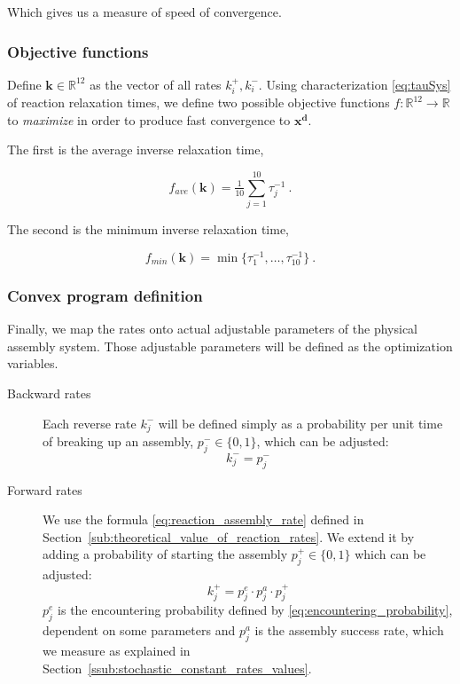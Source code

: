 		Which gives us a measure of speed of convergence.

		
		\subsubsection{Objective functions} %
		\label{ssub:objective_functions}
		
		Define $\mathbf{k} \in \mathbb{R}^{12}$ as the vector of all rates
		$k_i^+, k_i^-$. Using characterization \eqref{eq:tauSys} of reaction
		relaxation times, we define two possible objective functions
		$f:\mathbb{R}^{12} \rightarrow \mathbb{R}$ to {\it maximize} in
		order to produce fast convergence to $\mathbf{x^d}$.
		
		The first is the average inverse relaxation time,

		\begin{equation}
			f_{ave}(\mathbf{k}) = \tfrac{1}{10} \sum_{j=1}^{10} \tau_j^{-1}~.
		\end{equation}

		The second is the minimum inverse relaxation time,

		\begin{equation}
			f_{min}(\mathbf{k}) = \min \{ \tau_1^{-1}, \ldots, \tau_{10}^{-1}\}~.
		\end{equation}

		
		\subsubsection{Convex program definition} %
		\label{ssub:convex_program_definition}
		
		Finally, we map the rates onto actual adjustable parameters of the physical
		assembly system. Those adjustable parameters will be defined as the optimization variables.
		
		\begin{description}
			\item[Backward rates] Each reverse rate $k_j^-$ will be defined simply as a probability
			per unit time of breaking up an assembly, $p_j^- \in \{0, 1\}$, which can be
			adjusted: 
			\begin{equation} \label{eq:backward_rate_opt}
				k_j^- = p_j^-
			\end{equation}
			\item[Forward rates] We use the formula \eqref{eq:reaction_assembly_rate} defined in Section~\ref{sub:theoretical_value_of_reaction_rates}. We extend it by adding a probability of starting the assembly $p_j^+  \in \{0, 1\}$ which can be adjusted:
			\begin{equation} \label{eq:forward_rate_opt}
				k_j^+ = p^e_j \cdot p^a_j \cdot p_j^+
			\end{equation}
			$p_j^e$ is the encountering probability defined by \eqref{eq:encountering_probability}, dependent on some parameters and $p_j^a$ is the assembly success rate, which we measure as explained in Section~\ref{ssub:stochastic_constant_rates_values}.
		\end{description}

